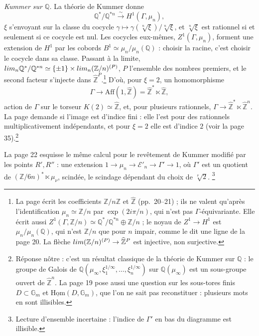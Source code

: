 \documentclass[11pt,a4paper]{article}
\begin{document}
\emph{Kummer sur $\mathbb{Q}$.} La théorie de Kummer donne
\[
\mathbb{Q}^{*}/\mathbb{Q}^{*n} \xrightarrow{\;\sim\;} H^{1}(\Gamma, \mu_{n}),
\]
$\xi$ s'envoyant sur la classe du cocycle $\gamma \mapsto
\gamma(\sqrt[n]{\xi})/\sqrt[n]{\xi}$, et $\sqrt[n]{\xi}$ est rationnel si et
seulement si ce cocycle est nul. Les cocycles eux-mêmes, $Z^{1}(\Gamma,
\mu_{n})$, forment une extension de $H^{1}$ par les cobords $B^{1} \simeq
\mu_{n}/\mu_{n}(\mathbb{Q})$ : choisir la racine, c'est choisir le cocycle dans
sa classe. Passant à la limite, $\varprojlim_{n} \mathbb{Q}^{*}/\mathbb{Q}^{*n}
\simeq \{\pm 1\} \times \varprojlim_{n} (\mathbb{Z}/n)^{(P)}$, $P$ l'ensemble des
nombres premiers, et le second facteur s'injecte dans
$\widehat{\mathbb{Z}}^{P}$.\footnote{La page écrit les coefficients
$\mathbb{Z}/n\mathbb{Z}$ et $\widehat{\mathbb{Z}}$ (pp.~20--21) ; ils ne valent
qu'après l'identification $\mu_{n} \simeq \mathbb{Z}/n$ par
$\exp(2i\pi/n)$, qui n'est pas $\Gamma$-équivariante. Elle écrit aussi
$Z^{1}(\Gamma, \mathbb{Z}/n) \simeq \mathbb{Q}^{*}/\mathbb{Q}^{*n} \oplus
\mathbb{Z}/n$ ; le noyau de $Z^{1} \to H^{1}$ est $\mu_{n}/\mu_{n}(\mathbb{Q})$,
qui n'est $\mathbb{Z}/n$ que pour $n$ impair, comme le dit une ligne de la page
20. La flèche $\varprojlim (\mathbb{Z}/n)^{(P)} \to \widehat{\mathbb{Z}}^{P}$ est
injective, non surjective.} D'où, pour $\xi = 2$, un homomorphisme
\[
\Gamma \longrightarrow \mathrm{Aff}(1, \widehat{\mathbb{Z}}) =
\widehat{\mathbb{Z}}^{*} \ltimes \widehat{\mathbb{Z}},
\]
action de $\Gamma$ sur le torseur $K(2) \simeq \widehat{\mathbb{Z}}$, et, pour
plusieurs rationnels, $\Gamma \to \widehat{\mathbb{Z}}^{*} \ltimes
\widehat{\mathbb{Z}}^{n}$. La page demande si l'image est d'indice fini : elle
l'est pour des rationnels multiplicativement indépendants, et pour $\xi = 2$
elle est d'indice $2$ (voir la page 35).\footnote{Réponse nôtre : c'est un
résultat classique de la théorie de Kummer sur $\mathbb{Q}$ : le groupe de Galois de
$\mathbb{Q}(\mu_{\infty}, \xi_{1}^{1/\infty}, \ldots, \xi_{n}^{1/\infty})$ sur
$\mathbb{Q}(\mu_{\infty})$ est un sous-groupe ouvert de $\widehat{\mathbb{Z}}^{n}$. La page 19 pose aussi une
question sur les sous-tores finis $D \subset \mathbb{G}_{m}$ et
$\underline{\mathrm{Hom}}(D, \mathbb{G}_{m})$, que l'on ne sait pas
reconstituer : plusieurs mots en sont illisibles.}

La page 22 esquisse le même calcul pour le revêtement de Kummer modifié par
les points $R', R''$ : une extension $1 \to \mu_{n} \to \mathcal{E}'_{n} \to
\Gamma' \to 1$, où $\Gamma'$ est un quotient de $(\mathbb{Z}/6n)^{*} \ltimes
\mu_{\nu}$, scindée, le scindage dépendant du choix de $\sqrt[\nu]{2}$.%
\footnote{Lecture d'ensemble incertaine : l'indice de $\Gamma'$ en bas du
diagramme est illisible.}
\end{document}
